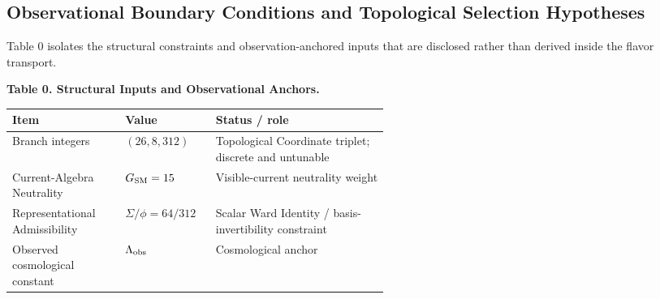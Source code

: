 \documentclass[11pt]{article}
\begin{document}
\subsection*{Observational Boundary Conditions and Topological Selection Hypotheses}

Table 0 isolates the structural constraints and observation-anchored inputs that are disclosed rather than derived inside the flavor transport.

\begin{table}[t]
\centering
\small
\renewcommand{\arraystretch}{1.15}
\textbf{Table 0. Structural Inputs and Observational Anchors.}\par\medskip
\begin{tabularx}{\linewidth}{L{0.30\linewidth}L{0.24\linewidth}Y}
\hline
Item & Value & Status / role \\
\hline
Branch integers & $(26,8,312)$ & Topological Coordinate triplet; discrete and untunable \\
Current-Algebra Neutrality & $G_{\rm SM}=15$ & Visible-current neutrality weight \\
Representational Admissibility & $\Sigma/\phi=64/312$ & Scalar Ward Identity / basis-invertibility constraint \\
Observed cosmological constant & $\Lambda_{\rm obs}$ & Cosmological anchor \\
\hline
\end{tabularx}
\end{table}
\end{document}
